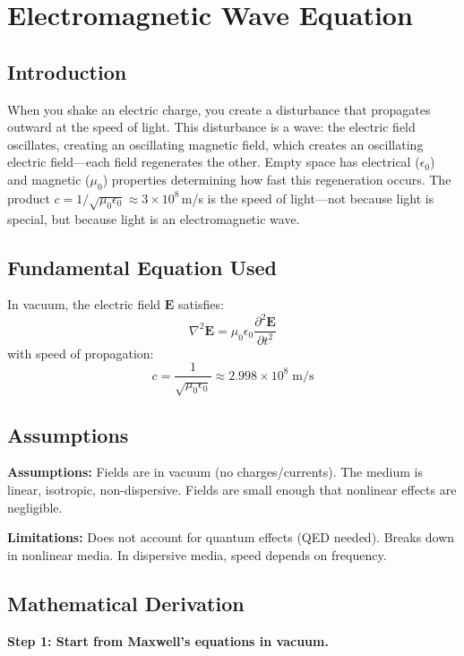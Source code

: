 \documentclass[11pt,openright]{book}
\begin{document}

\chapter{Electromagnetic Wave Equation}

\section*{Introduction}

When you shake an electric charge, you create a disturbance that propagates outward at the speed of light. This disturbance is a wave: the electric field oscillates, creating an oscillating magnetic field, which creates an oscillating electric field---each field regenerates the other. Empty space has electrical ($\epsilon_0$) and magnetic ($\mu_0$) properties determining how fast this regeneration occurs. The product $c = 1/\sqrt{\mu_0 \epsilon_0} \approx 3 \times 10^8$\,m/s is the speed of light---not because light is special, but because light is an electromagnetic wave.
\section*{Fundamental Equation Used}

In vacuum, the electric field $\mathbf{E}$ satisfies:
\[
\nabla^2 \mathbf{E} = \mu_0 \epsilon_0 \frac{\partial^2 \mathbf{E}}{\partial t^2}
\]
with speed of propagation:
\[
c = \frac{1}{\sqrt{\mu_0 \epsilon_0}} \approx 2.998 \times 10^8 \;\text{m/s}
\]
\section*{Assumptions}

\textbf{Assumptions:} Fields are in vacuum (no charges/currents). The medium is linear, isotropic, non-dispersive. Fields are small enough that nonlinear effects are negligible.


\textbf{Limitations:} Does not account for quantum effects (QED needed). Breaks down in nonlinear media. In dispersive media, speed depends on frequency.


\section*{Mathematical Derivation}

\textbf{Step 1: Start from Maxwell's equations in vacuum.}
\end{document}
